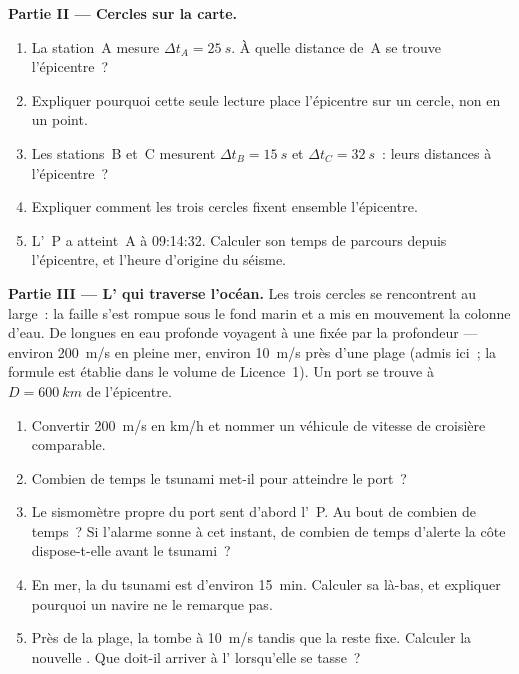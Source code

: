 \begin{problem}
\medskip
\noindent\textbf{Partie II --- Cercles sur la carte.}
\begin{enumerate}[resume]
  \item La station~A mesure $\Delta t_A = \qty{25}{s}$. À quelle
        distance de~A se trouve l'épicentre~?
  \item Expliquer pourquoi cette seule lecture place l'épicentre sur un
        cercle, non en un point.
  \item Les stations~B et~C mesurent $\Delta t_B = \qty{15}{s}$ et
        $\Delta t_C = \qty{32}{s}$~: leurs distances à l'épicentre~?
  \item Expliquer comment les trois cercles fixent ensemble l'épicentre.
  \item L'~P a atteint~A à 09:14:32. Calculer son temps de parcours
        depuis l'épicentre, et l'heure d'origine du séisme.
\end{enumerate}

\medskip
\noindent\textbf{Partie III --- L' qui traverse l'océan.}
Les trois cercles se rencontrent au large~: la faille s'est rompue sous
le fond marin et a mis en mouvement la colonne d'eau. De longues
 en eau profonde voyagent à une  fixée par la
profondeur --- environ \qty{200}{m/s} en pleine mer, environ
\qty{10}{m/s} près d'une plage (admis ici~; la formule est établie dans
le volume de Licence~1). Un port se trouve à $D = \qty{600}{km}$ de
l'épicentre.
\begin{enumerate}[resume]
  \item Convertir \qty{200}{m/s} en \unit{km/h} et nommer un véhicule de
        vitesse de croisière comparable.
  \item Combien de temps le tsunami met-il pour atteindre le port~?
  \item Le sismomètre propre du port sent d'abord l'~P. Au bout de
        combien de temps~? Si l'alarme sonne à cet instant, de
        combien de temps d'alerte la côte dispose-t-elle avant le tsunami~?
  \item En mer, la  du tsunami est d'environ \qty{15}{min}.
        Calculer sa  là-bas, et expliquer pourquoi un
        navire ne le remarque pas.
  \item Près de la plage, la  tombe à \qty{10}{m/s} tandis que
        la  reste fixe. Calculer la nouvelle
        . Que doit-il arriver à l'
        lorsqu'elle se tasse~?
\end{enumerate}


\end{problem}
